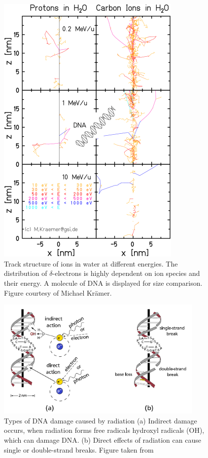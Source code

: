 \documentclass[type=dr, dr=rernat, accentcolor=tud7b,colorbacktitle, bigchapter, openright, twoside, 12pt ]{tudthesis}
\begin{document}
\begin{figure}[H]
\begin{center}
\includegraphics[width=0.8\textwidth]{./Images/trackstructure.png}
\caption{Track structure of ions in water at different energies. The distribution of $\delta$-electrons is highly dependent on ion species and their energy.
A molecule of DNA is displayed for size comparison. Figure courtesy of Michael Kr\"amer.}
\label{track}
\end{center}
\end{figure}


\begin{figure}[H]
\begin{center}
\includegraphics[width=0.9\textwidth]{./Images/SSB_DSB.png}
\caption{Types of DNA damage caused by radiation (a) Indirect damage occurs, when radiation forms free radicals hydroxyl radicals (OH), which can damage DNA. (b) Direct effects of radiation can cause single or double-strand breaks. 
Figure taken from \cite{Richter2012}}
\label{ida}
\end{center}
\end{figure}
\end{document}

